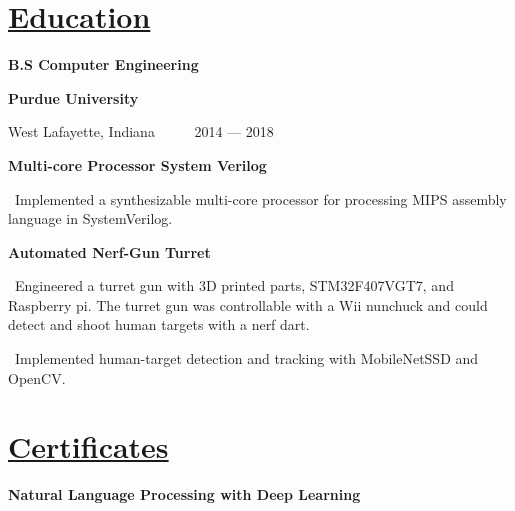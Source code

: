\documentclass{article}
\begin{document}
\begin{minipage}[t][0pt]{8in\linewidth}
\begin{minipage}[t]{3.1in\linewidth\hspace{2.8em}}
    \vspace{1em}
    \section{\underline{Education}}
    \vspace{-0.75em}
    \large\bfseries{B.S Computer Engineering}

    \bfseries{Purdue University} 

    \small\mdseries\textrm West Lafayette, Indiana \, \, \, \, \, 2014 — 2018

    \vspace{0.4em}

    \small\bfseries\textrm{Multi-core Processor System Verilog}
    
    \vspace{0.3em}
    \small\mdseries
    \hspace{0em}\textasteriskcentered \, \mdseries\textrm{Implemented a synthesizable multi-core processor for processing MIPS assembly language in SystemVerilog.}
    \vspace{0.8em}
    
    \small\bfseries\textrm{Automated Nerf-Gun Turret}
    
    \vspace{0.3em}
    \small\mdseries
    \hspace{0em}\textasteriskcentered \, \mdseries\textrm Engineered a turret gun with 3D printed parts, STM32F407VGT7, and Raspberry pi. The turret gun was controllable with a Wii nunchuck and could detect and shoot human targets with a nerf dart.

    \vspace{0.5em}
    \small\mdseries
    \hspace{0em}\textasteriskcentered \, \mdseries\textrm Implemented human-target detection and tracking with MobileNetSSD and OpenCV.

    \vspace{0.5em}     
    \section{\underline{Certificates}}
        \begin{minipage}[t]{3.3in\textwidth\hspace{0in}}    
            
            \vspace{-1.5em}        
            \mdseries\bfseries{Natural Language Processing with Deep Learning}
            

\end{minipage}
\end{minipage}
\end{minipage}
\end{document}
